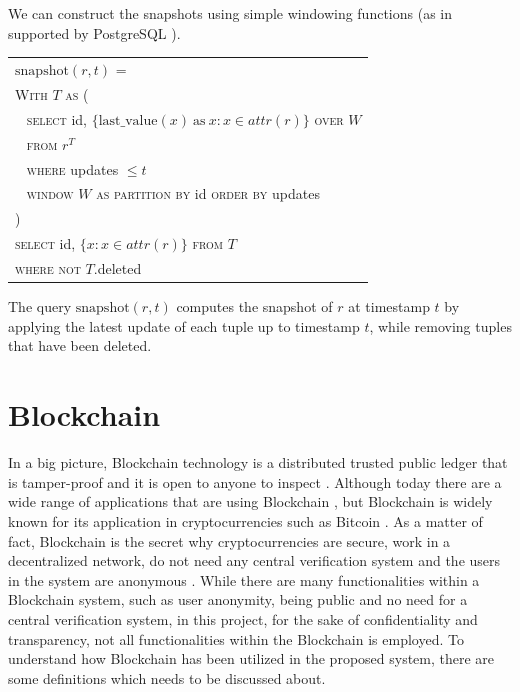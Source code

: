 We can construct the snapshots using simple windowing functions (as in supported
by PostgreSQL \cite{momjian2001postgresql}).

    \vspace{1em}
\begin{center}

{\small
	\begin{tabular}{|l|} \hline
		$\mathrm{snapshot}(r, t)$ = \\
		\verb|| \textsc{With} $T$ \textsc{as} ( \\
		\verb| | \textsc{select} id, $\{\mathrm{last\_value}(x) \mathrm{\ as\ } x:
		x\in attr(r)\}$ \textsc{over} $W$ \\
		\verb| | \textsc{from} $r^T$ \\
		\verb| | \textsc{where} updates $\leq t$ \\
		\verb| | \textsc{window} $W$ \textsc{as} 
		\textsc{partition by} id \textsc{order by} updates\\
		\verb|| ) \\
		\verb|| \textsc{select} id, $\{x: x\in attr(r)\}$ \textsc{from} $T$ \\
		\verb|| \textsc{where not} $T.$deleted \\ \hline
	\end{tabular}
}
\end{center}

The query $\mathrm{snapshot}(r, t)$ computes the snapshot of $r$ at timestamp
$t$ by applying the latest update of each tuple up to timestamp $t$, while
removing tuples that have been deleted.



\section{Blockchain}
In a big picture, Blockchain technology is a distributed trusted public ledger that is tamper-proof and it is open to anyone to inspect \cite{OECD2016Science}. Although today there are a wide range of applications that are using Blockchain \cite{dhillon2017blockchain}, but ‌Blockchain is widely known for its application in cryptocurrencies such as Bitcoin \cite{nakamoto2008bitcoin}. As a matter of fact, Blockchain is the secret why cryptocurrencies are secure, work in a decentralized network, do not need any central verification system and the users in the system are anonymous \cite{halaburda2016beyond}.
While there are many functionalities within a Blockchain system, such as user anonymity, being public and no need for a central verification system, in this project, for the sake of confidentiality and transparency, not all functionalities within the Blockchain is employed. To understand how Blockchain has been utilized in the proposed system, there are some definitions which needs to be discussed about.


